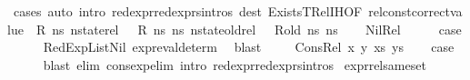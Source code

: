 \begin{isabellebody}
\ cases\ {\isacharparenleft}{\kern0pt}auto\ intro{\isacharcolon}{\kern0pt}\ red{\isacharunderscore}{\kern0pt}expr{\isacharunderscore}{\kern0pt}red{\isacharunderscore}{\kern0pt}exprs{\isachardot}{\kern0pt}intros\ dest{\isacharcolon}{\kern0pt}\ ExistsT{\isacharunderscore}{\kern0pt}Rel{\isachardot}{\kern0pt}IH{\isacharparenleft}{\kern0pt}{}{\isacharparenright}{\kern0pt}{\isacharbrackleft}{\kern0pt}OF\ {\isacartoucheopen}rel{\isacharunderscore}{\kern0pt}const{\isacharunderscore}{\kern0pt}correct{\isacharunderscore}{\kern0pt}value\ {\isasymLambda}\ R\ ns{}{\isacartoucheclose}\ {\isacartoucheopen}nstate{\isacharunderscore}{\kern0pt}rel\ {\isasymLambda}\ {\isasymLambda}{\isacharprime}{\kern0pt}\ R\ ns{}\ ns{}{\isacartoucheclose}\ {\isacartoucheopen}nstate{\isacharunderscore}{\kern0pt}old{\isacharunderscore}{\kern0pt}rel\ {\isasymLambda}\ {\isasymLambda}{\isacharprime}{\kern0pt}\ R{\isacharunderscore}{\kern0pt}old\ ns{}\ ns{}{\isacartoucheclose}{\isacharbrackright}{\kern0pt}{\isacharparenright}{\kern0pt}\isanewline
{}\isamarkupfalse%
\isanewline
\ \ \isamarkupfalse%
\ Nil{\isacharunderscore}{\kern0pt}Rel\isanewline
\ \ \isamarkupfalse%
\ \isamarkupfalse%
\ {\isacharquery}{\kern0pt}case\isanewline
\ \ \ \ \isamarkupfalse%
\ RedExpListNil\ expr{\isacharunderscore}{\kern0pt}eval{\isacharunderscore}{\kern0pt}determ{\isacharparenleft}{\kern0pt}{}{\isacharparenright}{\kern0pt}\ \isamarkupfalse%
\ blast\ \isanewline
{}\isamarkupfalse%
\isanewline
\ \ \isamarkupfalse%
\ {\isacharparenleft}{\kern0pt}Cons{\isacharunderscore}{\kern0pt}Rel\ x\ y\ xs\ ys{\isacharparenright}{\kern0pt}\isanewline
\ \ \isamarkupfalse%
\ {\isacharquery}{\kern0pt}case\isanewline
\ \ \ \ \isamarkupfalse%
\ {\isacharparenleft}{\kern0pt}blast\ elim{\isacharcolon}{\kern0pt}\ cons{\isacharunderscore}{\kern0pt}exp{\isacharunderscore}{\kern0pt}elim{}\ intro{\isacharcolon}{\kern0pt}\ red{\isacharunderscore}{\kern0pt}expr{\isacharunderscore}{\kern0pt}red{\isacharunderscore}{\kern0pt}exprs{\isachardot}{\kern0pt}intros{\isacharparenright}{\kern0pt}\isanewline
{}\isamarkupfalse%
%
\endisatagproof
{\isafoldproof}%
%
\isadelimproof
\isanewline
%
\endisadelimproof
\isanewline
\isanewline
{}\isamarkupfalse%
\ expr{\isacharunderscore}{\kern0pt}rel{\isacharunderscore}{\kern0pt}same{\isacharunderscore}{\kern0pt}set{\isacharcolon}{\kern0pt}\isanewline

\end{isabellebody}
